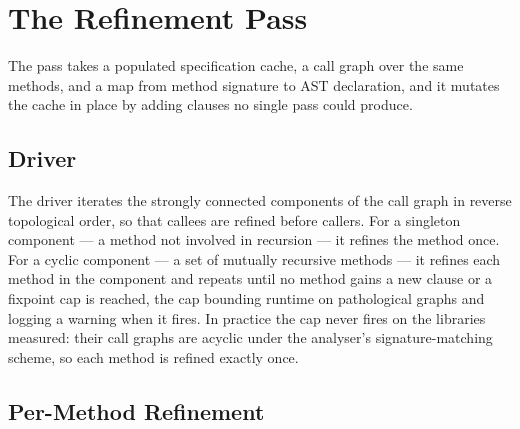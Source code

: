 \section{The Refinement Pass}
\label{sec:comp-algorithm}

The pass takes a populated specification cache, a call graph over the same
methods, and a map from method signature to AST declaration, and it mutates the
cache in place by adding clauses no single pass could produce.

\subsection{Driver}

The driver iterates the strongly connected components of the call graph in
reverse topological order, so that callees are refined before callers. For a
singleton component --- a method not involved in recursion --- it refines the
method once. For a cyclic component --- a set of mutually recursive methods ---
it refines each method in the component and repeats until no method gains a new
clause or a fixpoint cap is reached, the cap bounding runtime on pathological
graphs and logging a warning when it fires. In practice the cap never fires on
the libraries measured: their call graphs are acyclic under the analyser's
signature-matching scheme, so each method is refined exactly once.

\subsection{Per-Method Refinement}


